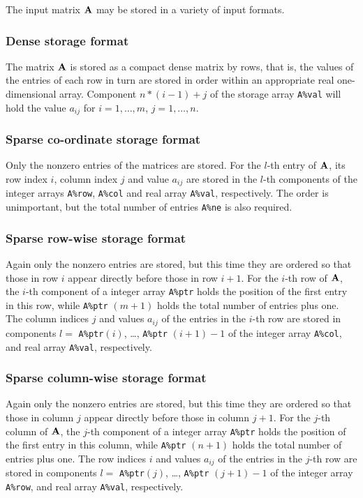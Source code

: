 \documentclass{galahad}
\begin{document}

\galmatrix
The input matrix ${\mathbf{A}}$ may be stored in a variety of input formats.

\subsubsection{Dense storage format}\label{dense}
The matrix ${\mathbf{A}}$ is stored as a compact
dense matrix by rows, that is, the values of the entries of each row in turn are
stored in order within an appropriate real one-dimensional array.
Component $n \ast (i-1) + j$ of the storage array {\tt A\%val} will hold the
value $a_{ij}$ for $i = 1, \ldots , m$, $j = 1, \ldots , n$.

\subsubsection{Sparse co-ordinate storage format}\label{coordinate}
Only the nonzero entries of the matrices are stored. For the
$l$-th entry of ${\mathbf{A}}$, its row index $i$, column index $j$
and value $a_{ij}$
are stored in the $l$-th components of the integer arrays {\tt A\%row},
{\tt A\%col} and real array {\tt A\%val}, respectively.
The order is unimportant, but the total
number of entries {\tt A\%ne} is also required.

\subsubsection{Sparse row-wise storage format}\label{rowwise}
Again only the nonzero entries are stored, but this time
they are ordered so that those in row $i$ appear directly before those
in row $i+1$. For the $i$-th row of ${\mathbf{A}}$, the $i$-th component of a
integer array {\tt A\%ptr} holds the position of the first entry in this row,
while {\tt A\%ptr} $(m+1)$ holds the total number of entries plus one.
The column indices $j$ and values $a_{ij}$ of the entries in the $i$-th row
are stored in components
$l =$ {\tt A\%ptr}$(i)$, \ldots , {\tt A\%ptr} $(i+1)-1$ of the
integer array {\tt A\%col}, and real array {\tt A\%val}, respectively.

\subsubsection{Sparse column-wise storage format}\label{colwise}
Again only the nonzero entries are stored, but this time
they are ordered so that those in column $j$ appear directly before those
in column $j+1$. For the $j$-th column of ${\mathbf{A}}$, the $j$-th component of a
integer array {\tt A\%ptr} holds the position of the first entry in this column,
while {\tt A\%ptr} $(n+1)$ holds the total number of entries plus one.
The row indices $i$ and values $a_{ij}$ of the entries in the $j$-th row
are stored in components
$l =$ {\tt A\%ptr}$(j)$, \ldots , {\tt A\%ptr} $(j+1)-1$ of the
integer array {\tt A\%row}, and real array {\tt A\%val}, respectively.
\end{document}
